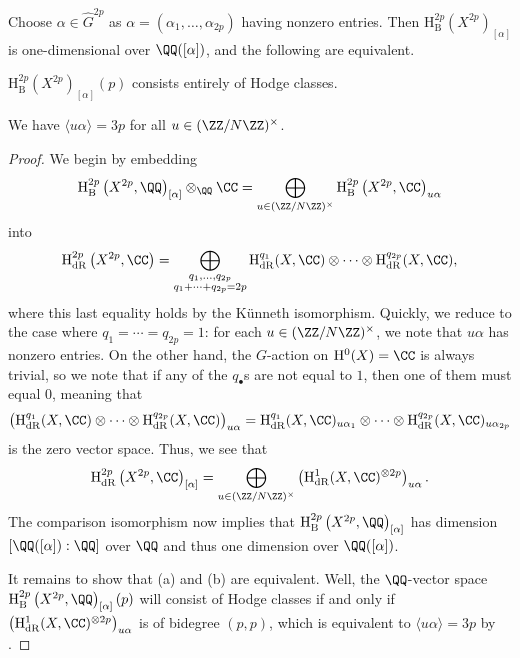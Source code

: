 \documentclass[../thesis.tex]{subfiles}
\begin{document}
\begin{proposition}
	Choose $\alpha\in\widehat G^{2p}$ as $\alpha=(\alpha_1,\ldots,\alpha_{2p})$ having nonzero entries. Then $\mathrm H_{\mathrm B}^{2p}\left(X^{2p}\right)_{[\alpha]}$ is one-dimensional over $\QQ([\alpha])$, and the following are equivalent.
	\begin{listalph}
		\item $\mathrm H_{\mathrm B}^{2p}\left(X^{2p}\right)_{[\alpha]}(p)$ consists entirely of Hodge classes.
		\item We have $\langle u\alpha\rangle=3p$ for all $u\in(\ZZ/N\ZZ)^\times$.
	\end{listalph}
\end{proposition}
\begin{proof}
	We begin by embedding
	\[\mathrm H_{\mathrm B}^{2p}\left(X^{2p},\QQ\right)_{[\alpha]}\otimes_\QQ\CC=\bigoplus_{u\in(\ZZ/N\ZZ)^\times}\mathrm H_{\mathrm B}^{2p}\left(X^{2p},\CC\right)_{u\alpha}\]
	into
	\[\mathrm H_{\mathrm{dR}}^{2p}\left(X^{2p},\CC\right)=\bigoplus_{\substack{q_1,\ldots,q_{2p}\\q_1+\cdots+q_{2p}=2p}}\mathrm H_{\mathrm{dR}}^{q_1}(X,\CC)\otimes\cdots\otimes\mathrm H_{\mathrm{dR}}^{q_{2p}}(X,\CC),\]
	where this last equality holds by the K\"unneth isomorphism. Quickly, we reduce to the case where $q_1=\cdots=q_{2p}=1$: for each $u\in(\ZZ/N\ZZ)^\times$, we note that $u\alpha$ has nonzero entries. On the other hand, the $G$-action on $\mathrm H^0(X)=\CC$ is always trivial, so we note that if any of the $q_\bullet$s are not equal to $1$, then one of them must equal $0$, meaning that
	\[\left(\mathrm H_{\mathrm{dR}}^{q_1}(X,\CC)\otimes\cdots\otimes\mathrm H_{\mathrm{dR}}^{q_{2p}}(X,\CC)\right)_{u\alpha}=\mathrm H_{\mathrm{dR}}^{q_1}(X,\CC)_{u\alpha_1}\otimes\cdots\otimes\mathrm H_{\mathrm{dR}}^{q_{2p}}(X,\CC)_{u\alpha_{2p}}\]
	is the zero vector space. Thus, we see that
	\[\mathrm H^{2p}_{\mathrm{dR}}\left(X^{2p},\CC\right)_{[\alpha]}=\bigoplus_{u\in(\ZZ/N\ZZ)^\times}\left(\mathrm H^1_{\mathrm{dR}}(X,\CC)^{\otimes2p}\right)_{u\alpha}.\]
	The comparison isomorphism now implies that $\mathrm H_{\mathrm B}^{2p}\left(X^{2p},\QQ\right)_{[\alpha]}$ has dimension $[\QQ([\alpha]):\QQ]$ over $\QQ$ and thus one dimension over $\QQ([\alpha])$.
	
	It remains to show that (a) and (b) are equivalent. Well, the $\QQ$-vector space $\mathrm H_{\mathrm B}^{2p}\left(X^{2p},\QQ\right)_{[\alpha]}(p)$ will consist of Hodge classes if and only if $\left(\mathrm H^1_{\mathrm{dR}}(X,\CC)^{\otimes2p}\right)_{u\alpha}$ is of bidegree $(p,p)$, which is equivalent to $\langle u\alpha\rangle=3p$ by .
\end{proof}
\end{document}
